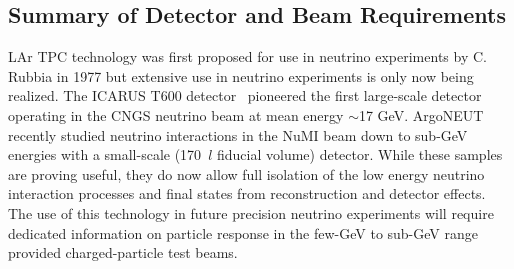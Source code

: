 \subsection{Summary of Detector and Beam Requirements }
\label{detbeam_main}

LAr TPC technology was first proposed for use in neutrino experiments by C. Rubbia in 1977
\cite{Rubbia} but extensive use in neutrino experiments is only now being realized. 
The ICARUS T600 detector~\cite{ICARUSrefs} pioneered the first large-scale detector operating in the CNGS 
neutrino beam at mean energy $\sim$17 GeV. ArgoNEUT~\cite{argoneut} recently studied 
neutrino interactions in the NuMI beam down to sub-GeV energies with a small-scale (170~$l$ fiducial volume) detector. 
While these samples are proving useful, they do now allow full isolation of
the low energy neutrino interaction processes
and final states from reconstruction and detector effects. 
The use of this technology in future precision neutrino experiments will require dedicated 
information on particle response
in the few-GeV to sub-GeV range provided charged-particle test beams. 

